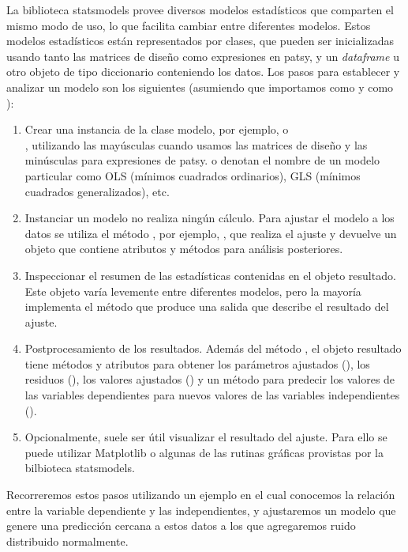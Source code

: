 La biblioteca statsmodels \cite{seabold2010} provee diversos modelos estadísticos que comparten el mismo modo de uso, lo que facilita cambiar entre diferentes modelos. Estos modelos estadísticos están representados por clases, que pueden ser inicializadas usando tanto las matrices de diseño como expresiones en patsy, y un \textit{dataframe} u otro objeto de tipo diccionario conteniendo los datos. Los pasos para establecer y analizar un modelo son los siguientes (asumiendo que importamos  como  y  como ):
\begin{enumerate}
 \item Crear una instancia de la clase modelo, por ejemplo,  o \\ , utilizando las mayúsculas cuando usamos las matrices de diseño y las minúsculas para expresiones de patsy.  o  denotan el nombre de un modelo particular como OLS (mínimos cuadrados ordinarios), GLS (mínimos cuadrados generalizados), etc.
 \item Instanciar un modelo no realiza ningún cálculo. Para ajustar el modelo a los datos se utiliza el método , por ejemplo, , que realiza el ajuste y devuelve un objeto que contiene atributos y métodos para análisis posteriores.
 \item Inspeccionar el resumen de las estadísticas contenidas en el objeto resultado. Este objeto varía levemente entre diferentes modelos, pero la mayoría implementa el método  que produce una salida que describe el resultado del ajuste.
 \item Postprocesamiento de los resultados. Además del método , el objeto resultado tiene métodos y atributos para obtener los parámetros ajustados (), los residuos (), los valores ajustados () y un método para predecir los valores de las variables dependientes para nuevos valores de las variables independientes ().
 \item Opcionalmente, suele ser útil visualizar el resultado del ajuste. Para ello se puede utilizar Matplotlib o algunas de las rutinas gráficas provistas por la bilbioteca statsmodels.
 \end{enumerate}

Recorreremos estos pasos utilizando un ejemplo en el cual conocemos la relación entre la variable dependiente y las independientes, y ajustaremos un modelo que genere una predicción cercana a estos datos a los que agregaremos ruido distribuido normalmente.

